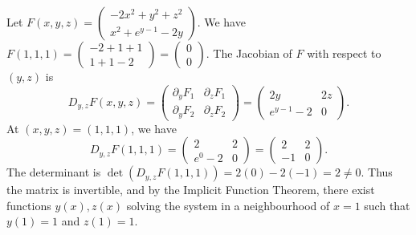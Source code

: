 \begin{exercisesolution}
Let $F(x,y,z) = \begin{pmatrix} -2x^2 + y^2 + z^2 \\ x^2 + e^{y-1} - 2y \end{pmatrix}$. We have $F(1,1,1) = \begin{pmatrix} -2+1+1 \\ 1+1-2 \end{pmatrix} = \begin{pmatrix} 0 \\ 0 \end{pmatrix}$.
The Jacobian of $F$ with respect to $(y,z)$ is
\[
D_{y,z} F(x,y,z) = \begin{pmatrix} \partial_y F_1 & \partial_z F_1 \\ \partial_y F_2 & \partial_z F_2 \end{pmatrix} = \begin{pmatrix} 2y & 2z \\ e^{y-1} - 2 & 0 \end{pmatrix}.
\]
At $(x,y,z) = (1,1,1)$, we have
\[
D_{y,z} F(1,1,1) = \begin{pmatrix} 2 & 2 \\ e^0 - 2 & 0 \end{pmatrix} = \begin{pmatrix} 2 & 2 \\ -1 & 0 \end{pmatrix}.
\]
The determinant is $\det(D_{y,z} F(1,1,1)) = 2(0) - 2(-1) = 2 \neq 0$. Thus the matrix is invertible, and by the Implicit Function Theorem, there exist functions $y(x), z(x)$ solving the system in a neighbourhood of $x=1$ such that $y(1)=1$ and $z(1)=1$.


\end{exercisesolution}

